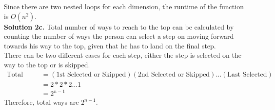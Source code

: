 \documentclass[11pt]{article}
\begin{document}
Since there are two nested loops for each dimension, the runtime of the function is $O(n^2)$.\\
\linebreak
\textbf{Solution 2c.} Total number of ways to reach to the top can be calculated by counting the number of ways the person can select a step on moving forward towards his way to the top, given that he has to land on the final step. \\
\linebreak
There can be two different cases for each step, either the step is selected on the way to the top or is skipped. \\
\begin{align*}
\text{Total ways} & = (\text{1st Selected or Skipped}) (\text{2nd Selected or Skipped}) \dots (\text{Last Selected}) \\ 
&= 2 * 2 * 2 \dots 1 \\
& = 2^{n-1}
\end{align*}
Therefore, total ways are $2^{n-1}$.
\end{document}

